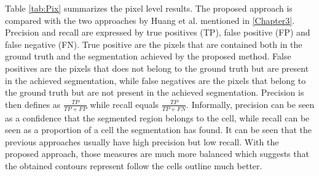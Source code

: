 Table \ref{tab:Pix} summarizes the pixel level results. The proposed approach is compared with the two approaches by Huang et al. mentioned in \ref{Chapter3}. Precision and recall are expressed by true positives (TP), false positive (FP) and false negative (FN). True positive are the pixels that are contained both in the ground truth and the segmentation achieved by the proposed method. False positives are the pixels that does not belong to the ground truth but are present in the achieved segmentation, while false negatives are the pixels that belong to the ground truth but are not present in the achieved segmentation. Precision is then defines as $\frac{TP}{TP + FP}$ while recall equals $\frac{TP}{TP + FN}$. Informally, precision can be seen as a confidence that the segmented region belongs to the cell, while recall can be seen as a proportion of a cell the segmentation has found. It can be seen that the previous approaches usually have high precision but low recall. With the proposed approach, those measures are much more balanced which suggests that the obtained contours represent follow the cells outline much better.

